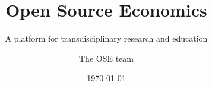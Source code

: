 \title{Open Source Economics}
\subtitle{A platform for transdisciplinary research and education}
\author{The OSE team}
\date{\today}

\begin{frame}[standout]{~}\titlepage\end{frame}
